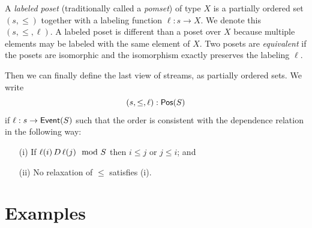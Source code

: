 A \emph{labeled poset} (traditionally called a \emph{pomset}) of type $X$ is a
partially ordered set $(s, \le)$ together with a labeling function $\ell: s \to X$. We denote this $(s, \le, \ell)$. A labeled poset is different than a poset over $X$ because multiple elements may be labeled with the same element of $X$.
Two posets are \emph{equivalent} if the posets are isomorphic and the isomorphism exactly preserves the labeling $\ell$.

Then we can finally define the last view of streams, as partially ordered sets.
We write
\[
(s, \le, \ell): \mathsf{Pos}({S})
\]
if $\ell: s \to \mathsf{Event}(S)$ such that the order is consistent with the dependence
relation in the following way:
\begin{enumerate}
\item[(i)] If $\ell(i) \,D\, \ell(j) \mod {S}$ then $i \le j$ or $j \le i$; and
\item[(ii)] No relaxation of $\le$ satisfies (i).
\end{enumerate}

\section{Examples}

